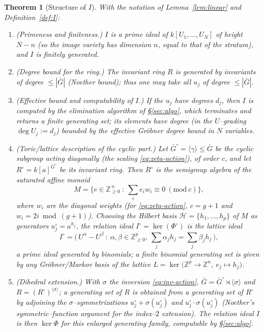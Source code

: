 \documentclass{amsart}
\newtheorem{theorem}{Theorem}
\theoremstyle{definition}
\begin{document}
\begin{theorem}[Structure of $I$]\label{thm:main}
With the notation of Lemma~\ref{lem:linear} and Definition~\ref{def:I}:
\begin{enumerate}
\item[(a)] \emph{(Primeness and finiteness.)} $I$ is a prime ideal of
$k[U_1,\dots,U_N]$ of height $N-n$ (so the image variety has dimension $n$, equal
to that of the stratum), and $I$ is finitely generated.
\item[(b)] \emph{(Degree bound for the ring.)} The invariant ring $R$ is generated
by invariants of degree $\le |\bar G|$ (Noether bound); thus one may take all
$u_j$ of degree $\le|\bar G|$.
\item[(c)] \emph{(Effective bound and computability of $I$.)} If the $u_j$ have
degrees $d_j$, then $I$ is computed by the elimination algorithm of
\S\ref{sec:algo}, which terminates and returns a finite generating set; its
elements have degree (in the $U$--grading $\deg U_j:=d_j$) bounded by the
effective Gr\"obner degree bound in $N$ variables.
\item[(d)] \emph{(Toric/lattice description of the cyclic part.)} Let
$\bar G^{\circ}=\langle\gamma\rangle\le\bar G$ be the cyclic subgroup acting
diagonally (the scaling \eqref{eq:zeta-action}), of order $c$, and let
$R^{\circ}=k[a]^{\bar G^{\circ}}$ be its invariant ring. Then $R^{\circ}$ is the
semigroup algebra of the saturated affine monoid
\[
 M=\{e\in\mathbb{Z}_{\ge0}^{\,n}\ :\ \textstyle\sum_i e_i w_i\equiv 0\ (\mathrm{mod}\ c)\},
\]
where $w_i$ are the diagonal weights (for \eqref{eq:zeta-action}, $c=g+1$ and
$w_i=2i\bmod(g+1)$). Choosing the Hilbert basis
$\mathcal H=\{h_1,\dots,h_p\}$ of $M$ as generators $u^{\circ}_j=a^{h_j}$, the
relation ideal $I^{\circ}=\ker(\Phi^{\circ})$ is the \emph{lattice ideal}
\begin{equation}\label{eq:toric}
 I^{\circ}=\bigl(\,U^{\alpha}-U^{\beta}\ :\ \alpha,\beta\in\mathbb{Z}_{\ge0}^{p},\
 \textstyle\sum_j \alpha_j h_j=\sum_j\beta_j h_j\,\bigr),
\end{equation}
a prime ideal generated by \emph{binomials}; a finite binomial generating set is
given by any Gr\"obner/Markov basis of the lattice
$L=\ker\bigl(\mathbb{Z}^{p}\to\mathbb{Z}^{n},\ e_j\mapsto h_j\bigr)$.
\item[(e)] \emph{(Dihedral extension.)} With $\sigma$ the inversion
\eqref{eq:inv-action}, $\bar G=\bar G^{\circ}\rtimes\langle\sigma\rangle$ and
$R=(R^{\circ})^{\langle\sigma\rangle}$; a generating set of $R$ is obtained from a
generating set of $R^{\circ}$ by adjoining the $\sigma$--symmetrizations
$u^{\circ}_j+\sigma(u^{\circ}_j)$ and $u^{\circ}_j\cdot\sigma(u^{\circ}_j)$
(Noether's symmetric--function argument for the index--$2$ extension). The
relation ideal $I$ is then $\ker\Phi$ for this enlarged generating family,
computable by \S\ref{sec:algo}.
\end{enumerate}
\end{theorem}
\end{document}
